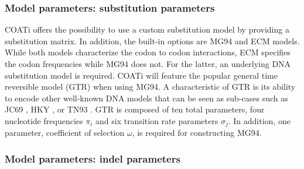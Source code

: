 \subsubsection{Model parameters: substitution parameters}
COATi offers the possibility to use a custom substitution model by providing a
substitution matrix.
In addition, the built-in options are MG94 and ECM models.
While both models characterize the codon to codon interactions, ECM specifies
the codon frequencies while MG94 does not.
For the latter, an underlying DNA substitution model is required.
COATi will feature the popular general time reversible model (GTR)
\parencite{tavare_gtr_1986} when using MG94.
A characteristic of GTR is its ability to encode other well-known DNA models
that can be seen as sub-cases such as JC69 \parencite{jukes1969mammalian},
HKY \parencite{hasegawa1985dating}, or TN93 \parencite{tamura1993estimation}.
GTR is composed of ten total parameters, four nucleotide frequencies $\pi_i$
and six transition rate parameters $\sigma_j$.
In addition, one parameter, coefficient of selection $\omega$, is required for
constructing MG94.



\subsubsection{Model parameters: indel parameters}

